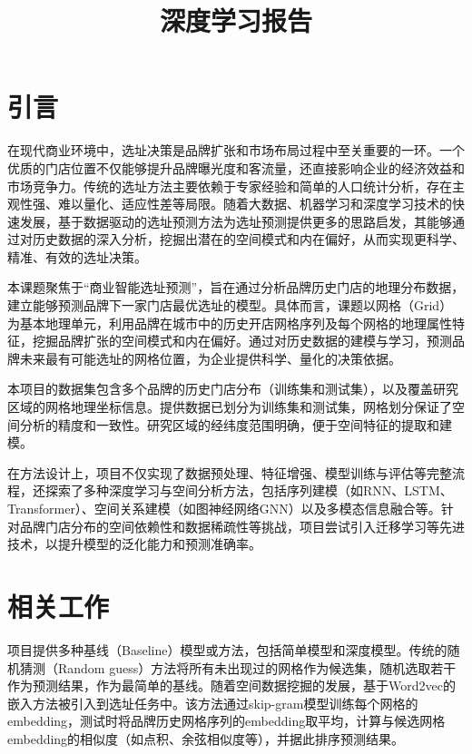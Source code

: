 \documentclass{article}
\title{深度学习报告}
\begin{document}
\maketitle

\begin{abstract}
\end{abstract}

\newpage

\tableofcontents
\newpage
\section{引言}
在现代商业环境中，选址决策是品牌扩张和市场布局过程中至关重要的一环。一个优质的门店位置不仅能够提升品牌曝光度和客流量，还直接影响企业的经济效益和市场竞争力。传统的选址方法主要依赖于专家经验和简单的人口统计分析，存在主观性强、难以量化、适应性差等局限。随着大数据、机器学习和深度学习技术的快速发展，基于数据驱动的选址预测方法为选址预测提供更多的思路启发，其能够通过对历史数据的深入分析，挖掘出潜在的空间模式和内在偏好，从而实现更科学、精准、有效的选址决策。

本课题聚焦于“商业智能选址预测”，旨在通过分析品牌历史门店的地理分布数据，建立能够预测品牌下一家门店最优选址的模型。具体而言，课题以网格（Grid）为基本地理单元，利用品牌在城市中的历史开店网格序列及每个网格的地理属性特征，挖掘品牌扩张的空间模式和内在偏好。通过对历史数据的建模与学习，预测品牌未来最有可能选址的网格位置，为企业提供科学、量化的决策依据。

本项目的数据集包含多个品牌的历史门店分布（训练集和测试集），以及覆盖研究区域的网格地理坐标信息。提供数据已划分为训练集和测试集，网格划分保证了空间分析的精度和一致性。研究区域的经纬度范围明确，便于空间特征的提取和建模。

在方法设计上，项目不仅实现了数据预处理、特征增强、模型训练与评估等完整流程，还探索了多种深度学习与空间分析方法，包括序列建模（如RNN、LSTM、Transformer）、空间关系建模（如图神经网络GNN）以及多模态信息融合等。针对品牌门店分布的空间依赖性和数据稀疏性等挑战，项目尝试引入迁移学习等先进技术，以提升模型的泛化能力和预测准确率。

\section{相关工作}

项目提供多种基线（Baseline）模型或方法，包括简单模型和深度模型。传统的随机猜测（Random guess）方法将所有未出现过的网格作为候选集，随机选取若干作为预测结果，作为最简单的基线。随着空间数据挖掘的发展，基于Word2vec的嵌入方法被引入到选址任务中。该方法通过skip-gram模型训练每个网格的embedding，测试时将品牌历史网格序列的embedding取平均，计算与候选网格embedding的相似度（如点积、余弦相似度等），并据此排序预测结果。
\end{document}
